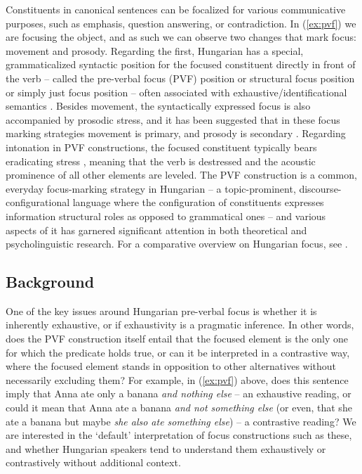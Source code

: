 \documentclass[a4paper, ruler]{CUP-JNL-LIN}%
\begin{document}
Constituents in canonical sentences can be focalized for various communicative purposes, such as emphasis, question answering, or contradiction. In (\ref{ex:pvf}) we are focusing the object, and as such we can observe two changes that mark focus: movement and prosody. Regarding the first, Hungarian has a special, grammaticalized syntactic position for the focused constituent directly in front of the verb -- called the pre-verbal focus (PVF) position \citep{wedgwood_2006_predication,balogh_2007_focus} or structural focus position \citep{ekiss_1998_multiple} or simply just focus position -- often associated with exhaustive/identificational semantics \citep{balogh_2013_hungarian}. Besides movement, the syntactically expressed focus is also accompanied by prosodic stress, and it has been suggested that in these focus marking strategies movement is primary, and prosody is secondary \citep{balogh_2013_hungarian}. Regarding intonation in PVF constructions, the focused constituent typically bears eradicating stress \citep[cf.][]{kornai_1988_hungarian,gecseg_2020_focused}, meaning that the verb is destressed and the acoustic prominence of all other elements are leveled. The PVF construction is a common, everyday focus-marking strategy in Hungarian -- a topic-prominent, discourse-configurational language where the configuration of constituents expresses information structural roles as opposed to grammatical ones \citep[cf.][]{ekiss_1995_discourse} -- and various aspects of it has garnered significant attention in both theoretical and psycholinguistic research. For a comparative overview on Hungarian focus, see \citep{bendefarkas_2006_comparing}.



\subsection{Background}

One of the key issues around Hungarian pre-verbal focus is whether it is inherently exhaustive, or if exhaustivity is a pragmatic inference. In other words, does the PVF construction itself entail that the focused element is the only one for which the predicate holds true, or can it be interpreted in a contrastive way, where the focused element stands in opposition to other alternatives without necessarily excluding them? For example, in (\ref{ex:pvf}) above, does this sentence imply that Anna ate only a banana \textit{and nothing else} -- an exhaustive reading, or could it mean that Anna ate a banana \textit{and not something else} (or even, that she ate a banana but maybe \textit{she also ate something else}) -- a contrastive reading? We are interested in the `default' interpretation of focus constructions such as these, and whether Hungarian speakers tend to understand them exhaustively or contrastively without additional context.
\end{document}
